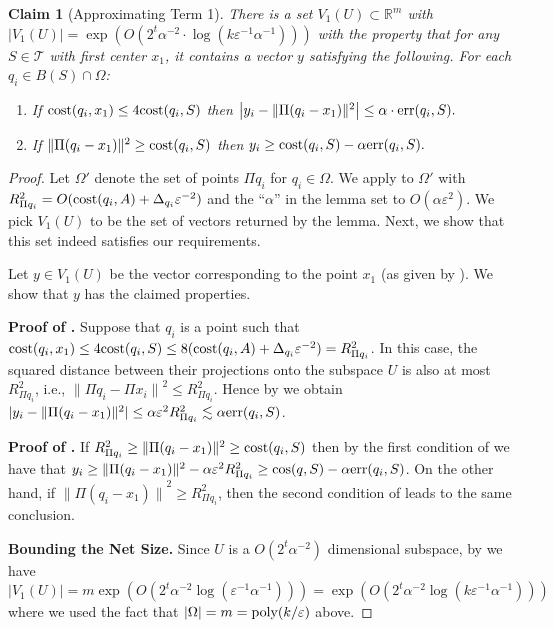 \documentclass[11pt]{article}
\newtheorem{claim}[lemma]{Claim}
\theoremstyle{restate}
\theoremstyle{definition}
\newcommand{\eps}{\ensuremath{\varepsilon}}
\newcommand{\R}{\ensuremath{\mathbb{R}}}
\newcommand{\norm}[1]{\ensuremath{\|#1\|}}
\newcommand{\poly}{\mbox{\rm poly}}
\newcommand{\cost}{\textnormal{cost}}
\newcommand{\err}{\textnormal{err}}
\begin{document}
\begin{claim}[Approximating Term 1]\label{clm: term-1}
    There is a set $V_1(U) \subset \R^{m}$ with  $|V_1(U)| = \exp(O( 2^t \alpha^{-2} \cdot \log(k \eps^{-1} \alpha^{-1})))$ with the property that for any $S \in \mathcal{T}$ with first center $x_1$, it contains a vector $y$ satisfying the following. For each $q_i \in B(S) \cap \Omega$:
    \begin{enumerate}
        \item \label{item: term1-a} If $\cost(q_i, x_1) \leq 4 \cost(q_i,S)$ then $\left|y_i - \norm{\Pi(q_i-x_1)}^2 \right| \leq \alpha\cdot  \err(q_i,S).$
        \item \label{item: term1-b} If  $\norm{\Pi(q_i-x_1)}^2 \geq \cost(q_i,S)$ then $y_i \geq  \cost(q_i,S) - \alpha \err(q_i,S).$
    \end{enumerate}
\end{claim}
\begin{proof}
    
    Let $\Omega'$ denote the set of points $\Pi q_i$ for $q_i \in \Omega$. We apply  to $\Omega'$ with $R_{\Pi q_i}^2 = O(\cost(q_i,A) + \Delta_{q_i} \eps^{-2})$ and the ``$\alpha$'' in the lemma set to $O(\alpha \eps^2)$. We pick $V_1(U)$ to be the set of vectors returned by the lemma. Next, we show that this set indeed satisfies our requirements.

    Let $y \in V_1(U)$ be the vector corresponding to the point $x_1$ (as given by ). We show that $y$ has the claimed properties.

    \noindent \textbf{Proof of .} Suppose that $q_i$ is a point such that  $\cost(q_i,x_1) \leq 4 \cost(q_i, S) \leq 8 (\cost(q_i,A) + \Delta_{q_i} \eps^{-2}) = R_{\Pi q_i}^2$. In this case, the squared distance between their projections onto the subspace $U$ is also at most $R_{\Pi q_i}^2$, i.e., $\norm{\Pi {q_i} - \Pi x_i}^2 \leq R_{\Pi q_i}^2$. Hence by  we obtain $|y_i - \norm{\Pi(q_i - x_1)}^2| \leq \alpha \eps^2 R_{\Pi q_i}^2 \lesssim \alpha \err(q_i,S)$. 

    \noindent \textbf{Proof of .} If $R_{\Pi q_i}^2 \geq \norm{\Pi(q_i - x_1)}^2 \geq  \cost(q_i,S)$ then by the first condition of  we have that $y_i \geq \norm{\Pi(q_i - x_1)}^2 - \alpha \eps^2 R_{\Pi q_i}^2 \geq  \cos(q,S) - \alpha \err(q_i, S)$. On the other hand, if $\norm{\Pi(q_i - x_1)}^2 \geq R_{\Pi q_i}^2$, then the second condition of  leads to the same conclusion.

    \noindent \textbf{Bounding the Net Size.} Since $U$ is a  $O(2^t\alpha^{-2})$ dimensional subspace, by  we have $|V_1(U)| = m \exp(O(2^t \alpha^{-2} \log( \eps^{-1} \alpha^{-1}))) = \exp(O( 2^t \alpha^{-2} \log(k \eps^{-1} \alpha^{-1})))$ where we used the fact that $|\Omega| = m= \poly(k/\eps)$ above.\qedhere
\end{proof}
\end{document}
